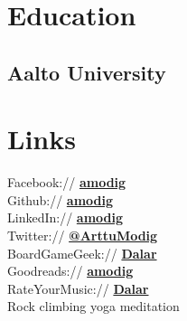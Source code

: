 \documentclass[]{deedy-resume-openfont}
\begin{document}
%
%
\lastupdated

%
%

%
%

\begin{minipage}[t]{0.33\textwidth} 


\section{Education} 

\subsection{Aalto University}
\vspace{0.5em}
\sectionsep


\section{Links} 
Facebook:// \href{https://facebook.com/amodig}{\bf amodig} \\
Github:// \href{https://github.com/amodig}{\bf amodig} \\
LinkedIn:// \href{https://www.linkedin.com/in/amodig}{\bf amodig} \\
Twitter:// \href{https://twitter.com/ArttuModig}{\bf @ArttuModig} \\
\sectionsep
{}
BoardGameGeek:// \href{https://boardgamegeek.com/user/dalar}{\bf Dalar} \\
Goodreads:// \href{https://goodreads.com/amodig}{\bf amodig} \\
RateYourMusic:// \href{https://rateyourmusic.com/~Dalar}{\bf Dalar} \\
Rock climbing \textbullet{} yoga \textbullet{} meditation
\sectionsep


\end{minipage}
\end{document}
